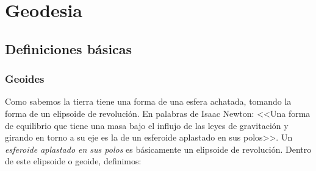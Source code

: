 
\chapter{Geodesia}


\section{Definiciones básicas}

\subsection{Geoides}

Como sabemos la tierra tiene una forma de una esfera achatada, tomando la forma de un elipsoide de revolución. En palabras de Isaac Newton: <<Una forma de equilibrio que tiene una masa bajo el influjo de las leyes de gravitación y girando en torno a su eje es la de un esferoide aplastado en sus polos>>. Un \textit{esferoide aplastado en sus polos} es básicamente un elipsoide de revolución. Dentro de este  elipsoide o geoide, definimos:


